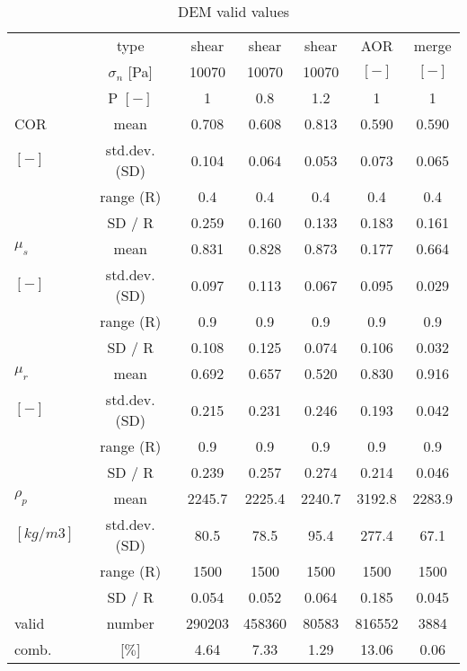 \begin{table}[h]
\centering
\begin{tabular}{lcccccc}
\hline

          & type  & shear & shear & shear & AOR   & merge \\
          & $\sigma_n$ [Pa] & 10070 & 10070 & 10070 & $[-]$ & $[-]$ \\
          & P $[-]$    & 1     & 0.8   & 1.2   & 1     & 1 \\
          \hline
    COR   & mean  & 0.708 & 0.608 & 0.813 & 0.590 & 0.590 \\
   $ [-] $  & std.dev. (SD) & 0.104 & 0.064 & 0.053 & 0.073 & 0.065 \\
          & range (R) & 0.4   & 0.4   & 0.4   & 0.4   & 0.4 \\
          & SD / R & 0.259 & 0.160 & 0.133 & 0.183 & 0.161 \\

    $\mu_s$ & mean  & 0.831 & 0.828 & 0.873 & 0.177 & 0.664 \\
    $ [-] $  & std.dev. (SD) & 0.097 & 0.113 & 0.067 & 0.095 & 0.029 \\
          & range (R) & 0.9   & 0.9   & 0.9   & 0.9   & 0.9 \\
          & SD / R & 0.108 & 0.125 & 0.074 & 0.106 & 0.032 \\

    $\mu_r$ & mean  & 0.692 & 0.657 & 0.520 & 0.830 & 0.916 \\
	$[-]  $ & std.dev. (SD) & 0.215 & 0.231 & 0.246 & 0.193 & 0.042 \\
          & range (R) & 0.9   & 0.9   & 0.9   & 0.9   & 0.9 \\
          & SD / R & 0.239 & 0.257 & 0.274 & 0.214 & 0.046 \\

    $\rho_p$ & mean  & 2245.7 & 2225.4 & 2240.7 & 3192.8 & 2283.9 \\
	$[kg/m3] $  & std.dev. (SD) & 80.5  & 78.5  & 95.4  & 277.4 & 67.1 \\
          & range (R) & 1500  & 1500  & 1500  & 1500  & 1500 \\
          & SD / R & 0.054 & 0.052 & 0.064 & 0.185 & 0.045 \\

    valid & number & 290203 & 458360 & 80583 & 816552 & 3884 \\
    comb. & [$\%$] & 4.64  & 7.33  & 1.29  & 13.06 & 0.06 \\

    

\hline
\end{tabular}
\caption{DEM valid values}
\label{tab:13DEMvalidvalues}
\end{table}